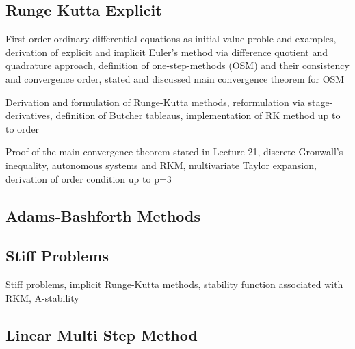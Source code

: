 \documentclass{article}
\theoremstyle{remark}
\begin{document}
\subsection{Runge Kutta Explicit }%
\label{sub:runge_kutta_explicit_}

\begin{tcolorbox}
  	First order ordinary differential equations as initial value proble and examples, derivation of explicit and implicit Euler's method via difference quotient and quadrature approach, definition of  one-step-methods (OSM) and their consistency and convergence order, stated and discussed main convergence theorem for OSM
\end{tcolorbox}
 
\begin{tcolorbox}
  Derivation and formulation of Runge-Kutta methods, reformulation via stage-derivatives, definition of Butcher tableaus, implementation of RK method up to to order	
\end{tcolorbox}

\begin{tcolorbox}
  Proof of the main convergence theorem stated in Lecture 21, discrete Gronwall's inequality, autonomous systems and RKM, multivariate Taylor expansion, derivation of order condition up to p=3	
\end{tcolorbox}

\subsection{Adams-Bashforth Methods}%
\label{sub:adams_bashforth_methods}

\subsection{Stiff Problems}%
\label{sub:stiff_problems}
\begin{tcolorbox}
  Stiff problems, implicit Runge-Kutta methods, stability function associated with RKM, A-stability	
\end{tcolorbox}

\subsection{Linear Multi Step Method}%
\label{sub:linear_multi_step_method}

 




\end{document}
